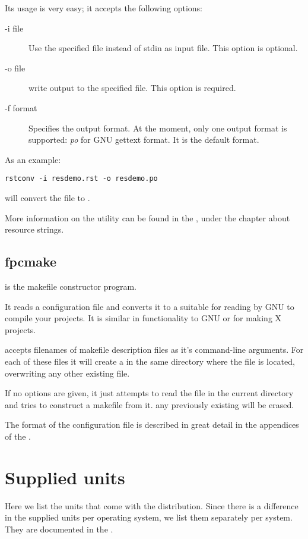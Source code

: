 \documentclass{report}
\begin{document}
Its usage is very easy; it accepts the following options:
\begin{description}
\item[-i file] Use the specified file instead of stdin as input file. This
option is optional.
\item[-o file] write output to the specified file. This option is required.
\item[-f format] Specifies the output format. At the moment, only one output
format is supported: {\em po} for GNU gettext  format.
It is the default format.
\end{description}
As an example:
\begin{verbatim}
rstconv -i resdemo.rst -o resdemo.po
\end{verbatim}
will convert the  file to .

More information on the  utility can be found in the \progref,
under the chapter about resource strings.

\subsection{fpcmake}

 is the \fpc makefile constructor program.

It reads a  configuration file and converts it to a
 suitable for reading by GNU  to compile
your projects. It is similar in functionality to GNU 
or  for making X projects.

 accepts filenames of makefile description files as it's
command-line arguments. For each of these files it will create a
 in the same directory where the file is located,
overwriting any other existing file.

If no options are given, it just attempts to read the file 
in the current directory and tries to construct a makefile from it.
any previously existing  will be erased.

The format of the  configuration file is described in great
detail in the appendices of the \progref.

\section{Supplied units}
Here we list the units that come with the \fpc distribution. Since there is
a difference in the supplied units per operating system, we list them
separately per system. They are documented in the \unitsref.
\end{document}
